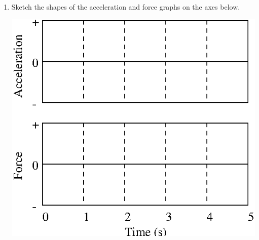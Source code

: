 \begin{enumerate}
\item Sketch the shapes of the acceleration and force graphs on the axes below.

\vspace{0.3cm}
{\par\centering \includegraphics{iqsForce/force1_fig9.eps} \par}
\vspace{0.3cm}

\end{enumerate}
